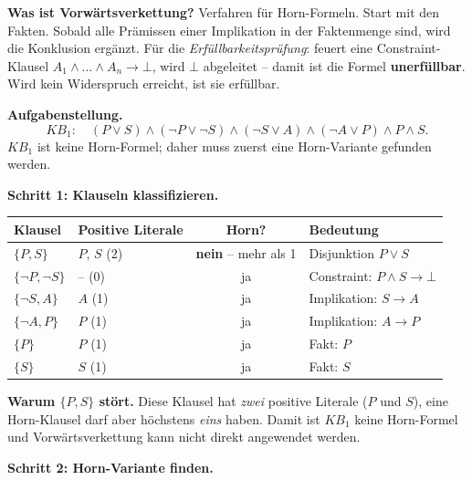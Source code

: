 \documentclass[a4paper,12pt]{article}
\begin{document}
\medskip
\textbf{Was ist Vorw\"artsverkettung?}
Verfahren f\"ur Horn-Formeln. Start mit den Fakten. Sobald alle Pr\"amissen
einer Implikation in der Faktenmenge sind, wird die Konklusion erg\"anzt.
F\"ur die \emph{Erf\"ullbarkeitspr\"ufung}: feuert eine Constraint-Klausel
$A_1 \wedge \dots \wedge A_n \to \bot$, wird $\bot$ abgeleitet -- damit ist
die Formel \textbf{unerf\"ullbar}. Wird kein Widerspruch erreicht, ist sie
erf\"ullbar.

\medskip
\textbf{Aufgabenstellung.}
\[
KB_1: \quad (P \vee S) \wedge (\neg P \vee \neg S) \wedge (\neg S \vee A) \wedge (\neg A \vee P) \wedge P \wedge S.
\]
$KB_1$ ist keine Horn-Formel; daher muss zuerst eine Horn-Variante
gefunden werden.

\bigskip
\textbf{Schritt 1: Klauseln klassifizieren.}

\begin{center}
\renewcommand{\arraystretch}{1.25}
\begin{tabular}{llcl}
\toprule
Klausel               & Positive Literale & Horn?                       & Bedeutung \\
\midrule
$\{P, S\}$            & $P$, $S$ \;(2)    & \textbf{nein} -- mehr als 1 & Disjunktion $P \vee S$ \\
$\{\neg P, \neg S\}$  & -- \;(0)          & ja                          & Constraint: $P \wedge S \to \bot$ \\
$\{\neg S, A\}$       & $A$ \;(1)         & ja                          & Implikation: $S \to A$ \\
$\{\neg A, P\}$       & $P$ \;(1)         & ja                          & Implikation: $A \to P$ \\
$\{P\}$               & $P$ \;(1)         & ja                          & Fakt: $P$ \\
$\{S\}$               & $S$ \;(1)         & ja                          & Fakt: $S$ \\
\bottomrule
\end{tabular}
\end{center}

\textbf{Warum $\{P, S\}$ st\"ort.}
Diese Klausel hat \emph{zwei} positive Literale ($P$ und $S$), eine
Horn-Klausel darf aber h\"ochstens \emph{eins} haben. Damit ist $KB_1$
keine Horn-Formel und Vorw\"artsverkettung kann nicht direkt angewendet
werden.

\bigskip
\textbf{Schritt 2: Horn-Variante finden.}
\end{document}
